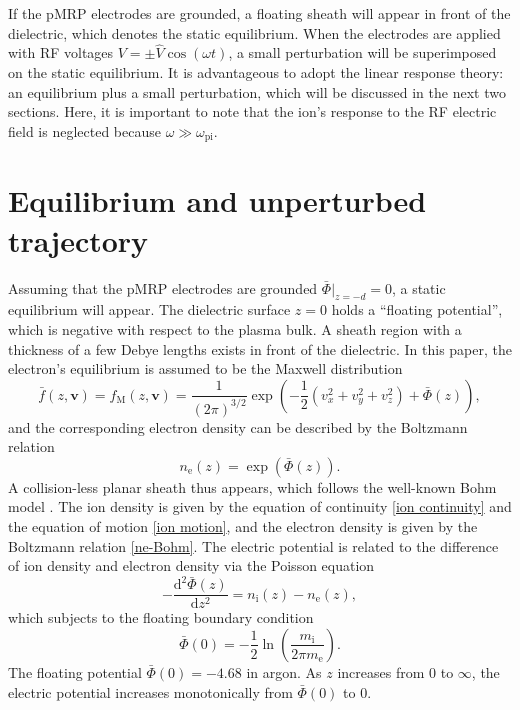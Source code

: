 \documentclass[superscriptaddress,preprint]{revtex4}  %
\renewcommand{\vec}{\mathbf}
\begin{document}
If the pMRP electrodes are grounded, a floating sheath will appear in front of the dielectric, which denotes the static equilibrium. When the electrodes are applied with RF voltages $V=\pm \hat{V} \cos(\omega t)$, a small perturbation will be superimposed on the static equilibrium. It is advantageous to adopt the linear response theory: an equilibrium plus a small perturbation, which will be discussed in the next two sections. Here, it is important to note that the ion's response to the RF electric field is neglected because $\omega \gg \omega_\mathrm{pi}$.

\pagebreak




\section{Equilibrium and unperturbed trajectory}
Assuming that the pMRP electrodes are grounded $\bar\Phi|_{z=-d}=0$, a static equilibrium will appear. The dielectric surface $z=0$ holds a ``floating potential'', which is negative with respect to the plasma bulk. A sheath region with a thickness of a few Debye lengths exists in front of the dielectric. In this paper, the electron's equilibrium is assumed to be the Maxwell distribution
\begin{equation}
\bar f(z,\vec{v})=f_\mathrm{M}(z,\vec{v})=\frac{1}{(2 \pi)^{3/2}} 
\exp\left(-\frac{1}{2}\left(v_x^2+v_y^2+v_z^2\right)+\bar{\Phi}(z)\right),
\end{equation}
and the corresponding electron density can be described by the Boltzmann relation
\begin{equation}
n_\mathrm{e}(z)=\exp\left(\bar\Phi(z)\right). \label{ne-Bohm}
\end{equation}
A collision-less planar sheath thus appears, which follows the well-known Bohm model \cite{Bohm1949}. The ion density is given by the equation of continuity \eqref{ion continuity} and the equation of motion \eqref{ion motion}, and the electron density is given by the Boltzmann relation \eqref{ne-Bohm}. The electric potential is related to the difference of ion density and electron density via the Poisson equation
\begin{equation}
-\frac{\mathrm{d}^2 \bar\Phi(z)}{\mathrm{d} z^2}=n_\mathrm{i}(z)-n_\mathrm{e}(z),
\end{equation}
which subjects to the floating boundary condition
\begin{equation}
\bar\Phi(0)=-\frac{1}{2} \ln \left( \frac{m_\mathrm{i}}{2 \pi m_\mathrm{e}} \right).
\end{equation}
The floating potential $\bar\Phi(0)=-4.68$ in argon. As $z$ increases from $0$ to $\infty$, the electric potential increases monotonically from $\bar\Phi(0)$ to $0$. 
\end{document}
